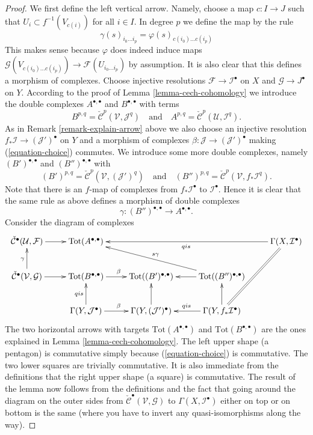 \documentclass[10pt,a4paper]{amsart}
\theoremstyle{plain}
\theoremstyle{definition}
\theoremstyle{remark}
\numberwithin{equation}{subsection}
\begin{document}
\begin{proof}
We first define the left vertical arrow. Namely, choose a map
$c : I \to J$ such that $U_i \subset f^{-1}(V_{c(i)})$ for all
$i \in I$. In degree $p$ we define the map by the rule
$$
\gamma(s)_{i_0 \ldots i_p} = \varphi(s)_{c(i_0) \ldots c(i_p)}
$$
This makes sense because $\varphi$ does indeed induce maps
$\mathcal{G}(V_{c(i_0) \ldots c(i_p)}) \to \mathcal{F}(U_{i_0 \ldots i_p})$
by assumption. It is also clear that this defines a morphism of complexes.
Choose injective resolutions
$\mathcal{F} \to \mathcal{I}^\bullet$ on $X$ and
$\mathcal{G} \to J^\bullet$ on $Y$. According to
the proof of Lemma \ref{lemma-cech-cohomology} we introduce the double
complexes $A^{\bullet, \bullet}$ and $B^{\bullet, \bullet}$
with terms
$$
B^{p, q} = \check{\mathcal{C}}^p(\mathcal{V}, \mathcal{J}^q)
\quad
\text{and}
\quad
A^{p, q} = \check{\mathcal{C}}^p(\mathcal{U}, \mathcal{I}^q).
$$
As in Remark \ref{remark-explain-arrow} above we also choose an
injective resolution
$f_*\mathcal{I} \to (\mathcal{J}')^\bullet$ on $Y$ and a morphism
of complexes $\beta : \mathcal{J} \to (\mathcal{J}')^\bullet$
making (\ref{equation-choice}) commutes. We introduce some more
double complexes, namely $(B')^{\bullet, \bullet}$ and
$(B'')^{\bullet, \bullet}$ with
$$
(B')^{p, q} = \check{\mathcal{C}}^p(\mathcal{V}, (\mathcal{J}')^q)
\quad
\text{and}
\quad
(B'')^{p, q} = \check{\mathcal{C}}^p(\mathcal{V}, f_*\mathcal{I}^q).
$$
Note that there is an $f$-map of complexes from
$f_*\mathcal{I}^\bullet$ to $\mathcal{I}^\bullet$. Hence
it is clear that the same rule as above defines a morphism
of double complexes
$$
\gamma : (B'')^{\bullet, \bullet} \longrightarrow A^{\bullet, \bullet}.
$$
Consider the diagram of complexes
$$
\xymatrix{
\check{\mathcal{C}}^\bullet(\mathcal{U}, \mathcal{F})
\ar[r] &
\text{Tot}(A^{\bullet, \bullet}) & & &
\Gamma(X, \mathcal{I}^\bullet) \ar[lll]^{qis}
\ar@{=}[ddl]\\
\check{\mathcal{C}}^\bullet(\mathcal{V}, \mathcal{G})
\ar[r] \ar[u]^\gamma &
\text{Tot}(B^{\bullet, \bullet}) \ar[r]^\beta &
\text{Tot}((B')^{\bullet, \bullet}) &
\text{Tot}((B'')^{\bullet, \bullet}) \ar[l] \ar[llu]_{s\gamma} \\
& \Gamma(Y, \mathcal{J}^\bullet) \ar[u]^{qis} \ar[r]^\beta &
\Gamma(Y, (\mathcal{J}')^\bullet) \ar[u] &
\Gamma(Y, f_*\mathcal{I}^\bullet) \ar[u] \ar[l]_{qis}
}
$$
The two horizontal arrows with targets $\text{Tot}(A^{\bullet, \bullet})$ and
$\text{Tot}(B^{\bullet, \bullet})$
are the ones explained in Lemma \ref{lemma-cech-cohomology}.
The left upper shape (a pentagon) is commutative simply
because (\ref{equation-choice}) is commutative.
The two lower squares are trivially commutative.
It is also immediate from the definitions that the
right upper shape (a square) is commutative.
The result of the lemma now follows from the definitions
and the fact that going around the diagram on the outer sides
from $\check{\mathcal{C}}^\bullet(\mathcal{V}, \mathcal{G})$
to $\Gamma(X, \mathcal{I}^\bullet)$ either on top or on bottom
is the same (where you have to invert any quasi-isomorphisms along the way).
\end{proof}
\end{document}

